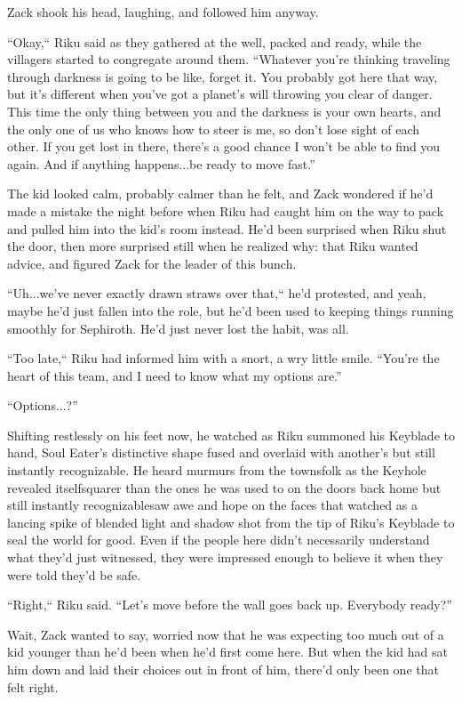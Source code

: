 Zack shook his head, laughing, and followed him anyway.


\scenechange


``Okay,`` Riku said as they gathered at the well, packed and ready, while the villagers started to congregate around them. ``Whatever you're thinking traveling through darkness is going to be like, forget it. You probably got here that way, but it's different when you've got a planet's will throwing you clear of danger. This time the only thing between you and the darkness is your own hearts, and the only one of us who knows how to steer is me, so don't lose sight of each other. If you get lost in there, there's a good chance I won't be able to find you again. And if anything happens...be ready to move fast.''

The kid looked calm, probably calmer than he felt, and Zack wondered if he'd made a mistake the night before when Riku had caught him on the way to pack and pulled him into the kid's room instead. He'd been surprised when Riku shut the door, then more surprised still when he realized why: that Riku wanted advice, and figured Zack for the leader of this bunch.

``Uh...we've never exactly drawn straws over that,`` he'd protested, and yeah, maybe he'd just fallen into the role, but he'd been used to keeping things running smoothly for Sephiroth. He'd just never lost the habit, was all.

``Too late,`` Riku had informed him with a snort, a wry little smile. ``You're the heart of this team, and I need to know what my options are.''

``Options...?''

Shifting restlessly on his feet now, he watched as Riku summoned his Keyblade to hand, Soul Eater's distinctive shape fused and overlaid with another's but still instantly recognizable. He heard murmurs from the townsfolk as the Keyhole revealed itself\textemdash squarer than the ones he was used to on the doors back home but still instantly recognizable\textemdash saw awe and hope on the faces that watched as a lancing spike of blended light and shadow shot from the tip of Riku's Keyblade to seal the world for good. Even if the people here didn't necessarily understand what they'd just witnessed, they were impressed enough to believe it when they were told they'd be safe.

``Right,`` Riku said. ``Let's move before the wall goes back up. Everybody ready?''

Wait, Zack wanted to say, worried now that he was expecting too much out of a kid younger than he'd been when he'd first come here. But when the kid had sat him down and laid their choices out in front of him, there'd only been one that felt right.

